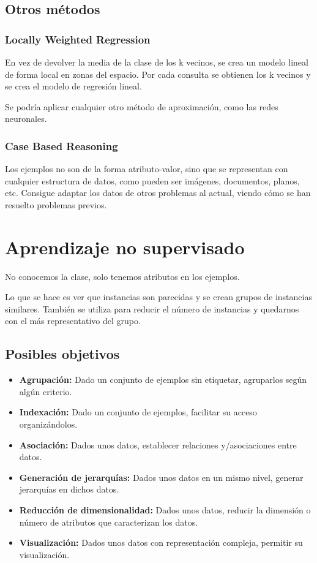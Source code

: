 \documentclass[12pt]{report} %
\begin{document}
\subsection{Otros métodos}
\subsubsection{Locally Weighted Regression}
En vez de devolver la media de la clase de los k vecinos, se crea un modelo lineal de forma local en zonas del espacio. Por cada consulta se obtienen los k vecinos y se crea el modelo de regresión lineal.

Se podría aplicar cualquier otro método de aproximación, como las redes neuronales.
\subsubsection{Case Based Reasoning}
Los ejemplos no son de la forma atributo-valor, sino que se representan con cualquier estructura de datos, como pueden ser imágenes, documentos, planos, etc. Consigue adaptar los datos de otros problemas al actual, viendo cómo se han resuelto problemas previos.

\newpage

\section{Aprendizaje no supervisado}
No conocemos la clase, solo tenemos atributos en los ejemplos.

Lo que se hace es ver que instancias son parecidas y se crean grupos de instancias similares. También se utiliza para reducir el número de instancias y quedarnos con el más representativo del grupo.

\subsection{Posibles objetivos}
\begin{itemize}
  \item \textbf{Agrupación:} Dado un conjunto de ejemplos sin etiquetar, agruparlos según algún criterio.
  \item \textbf{Indexación:} Dado un conjunto de ejemplos, facilitar su acceso organizándolos.
  \item \textbf{Asociación:} Dados unos datos, establecer relaciones y/asociaciones entre datos.
  \item \textbf{Generación de jerarquías:} Dados unos datos en un mismo nivel, generar jerarquías en dichos datos.
  \item \textbf{Reducción de dimensionalidad:} Dados unos datos, reducir la dimensión o número de atributos que caracterizan los datos.
  \item \textbf{Visualización:} Dados unos datos con representación compleja, permitir su visualización.
\end{itemize}
\end{document}
